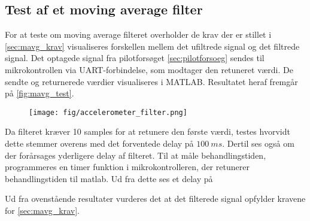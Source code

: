 \subsection{Test af et moving average filter}
For at teste om moving average filteret overholder de krav der er stillet i \autoref{sec:mavg_krav} visualiseres forskellen mellem det ufiltrede signal og det filtrede signal. Det optagede signal fra pilotforsøget \autoref{sec:pilotforsoeg} sendes til mikrokontrollen via UART-forbindelse, som modtager den retuneret værdi. De sendte og returnerede værdier visualiseres i MATLAB. Resultatet heraf fremgår på \autoref{fig:mavg_test}. 

\begin{figure}[H]
	\centering
	\texttt{[image: fig/accelerometer\_filter.png]}
	\caption{ }
	\label{fig:mavg_test}
\end{figure}


Da filteret kræver 10 samples for at retunere den første værdi, testes hvorvidt dette stemmer overens med det forventede delay på $100~ms$. Dertil ses også om der forårsages yderligere delay af filteret. Til at måle behandlingstiden, programmeres en timer funktion i mikrokontrolleren, der retunerer behandlingstiden til matlab. Ud fra dette ses et delay på  

Ud fra ovenstående resultater vurderes det at det filterede signal opfylder kravene for \autoref{sec:mavg_krav}. 